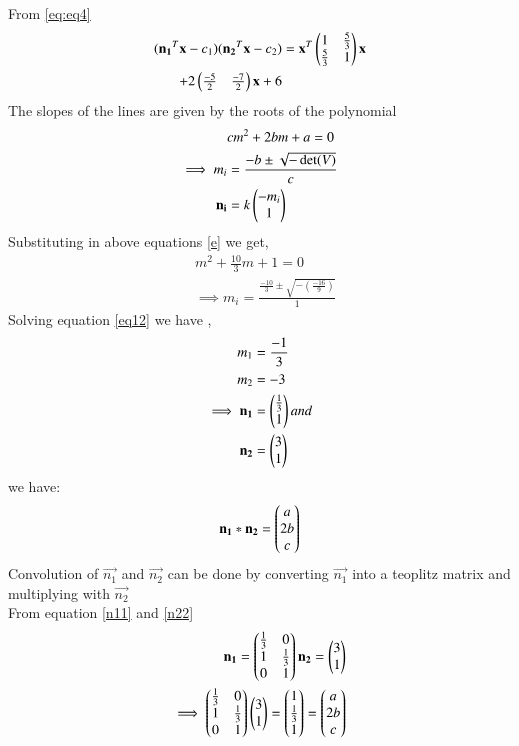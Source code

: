 \documentclass[journal,12pt,twocolumn]{IEEEtran}
\begin{document}
From \eqref{eq:eq4}
\begin{align}
(\mathbf{n_1}^T\mathbf{x}-c_1)(\mathbf{n_2}^T\mathbf{x}-c_2) &=\mathbf{x}^T\begin{pmatrix}1 & \frac{5}{3} \\\frac{5}{3} & 1\end{pmatrix}\mathbf{x}\notag\\
+2\begin{pmatrix}\frac{-5}{2} & \frac{-7}{2}\end{pmatrix}\mathbf{x}+6\label{86}
\end{align}
The slopes of the lines are given by the roots of the polynomial 
\begin{align}
    &cm^2+2bm+a=0\label{e}\\
    \implies m_i&=\frac{-b\pm{\sqrt{-\det(V)}}}{c}\\
    \mathbf{n_i}&=k\begin{pmatrix}-m_i\\1\end{pmatrix}
\end{align}
Substituting  in above equations \eqref{e} we get,
\begin{align}
    &m^2+\frac{10}{3}m+1=0\\
    &\implies m_i=\frac{\frac{-10}{3}\pm{\sqrt{-(\frac{-16}{9})}}}{1}\label{eq12}
\end{align}
Solving equation \eqref{eq12} we have ,
\begin{align}
    m_1&=\frac{-1}{3}\\
    m_2&=-3\\
  \implies \mathbf{n_1}&=\begin{pmatrix}\frac{1}{3} \\1\end{pmatrix}\label{n11} and \\
    \mathbf{n_2}&=\begin{pmatrix}3\\1\end{pmatrix}\label{n22}
\end{align}
we have: 
\begin{align}
\mathbf{n_1}\ast \mathbf{n_2} = \begin{pmatrix}a\\2b\\c\end{pmatrix} \label{eq:conv1}
\end{align}
Convolution of $\vec{n_1}$ and $\vec{n_2}$ can be done by converting  $\vec{n_1}$ into a teoplitz matrix and multiplying with $\vec{n_2}$\\
From equation \eqref{n11} and \eqref{n22}
\begin{align}
    \mathbf{n_1}=\begin{pmatrix}\frac{1}{3}&0\\1&\frac{1}{3}\\0&1\end{pmatrix}
    \mathbf{n_2}=\begin{pmatrix}3\\ 1\end{pmatrix}\label{eq:conv2}\\
\implies \begin{pmatrix}\frac{1}{3}&0\\1&\frac{1}{3}\\0&1\end{pmatrix}\begin{pmatrix}3\\ 1\end{pmatrix} = \begin{pmatrix}1\\\frac{1}{3}\\1\end{pmatrix} = \begin{pmatrix}a\\2b\\c\end{pmatrix}\label{eq:conv3}
\end{align}
\end{document}
